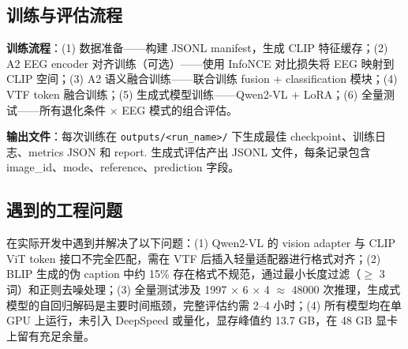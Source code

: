 \subsection{训练与评估流程}

\textbf{训练流程}：(1) 数据准备——构建 JSONL manifest，生成 CLIP 特征缓存；(2) A2 EEG encoder 对齐训练（可选）——使用 InfoNCE 对比损失将 EEG 映射到 CLIP 空间；(3) A2 语义融合训练——联合训练 fusion + classification 模块；(4) VTF token 融合训练；(5) 生成式模型训练——Qwen2-VL + LoRA；(6) 全量测试——所有退化条件 $\times$ EEG 模式的组合评估。

\textbf{输出文件}：每次训练在 \texttt{outputs/<run\_name>/} 下生成最佳 checkpoint、训练日志、metrics JSON 和 report. 生成式评估产出 JSONL 文件，每条记录包含 image\_id、mode、reference、prediction 字段。

\subsection{遇到的工程问题}

在实际开发中遇到并解决了以下问题：(1) Qwen2-VL 的 vision adapter 与 CLIP ViT token 接口不完全匹配，需在 VTF 后插入轻量适配器进行格式对齐；(2) BLIP 生成的伪 caption 中约 15\% 存在格式不规范，通过最小长度过滤（$\geq$ 3 词）和正则去噪处理；(3) 全量测试涉及 1997 $\times$ 6 $\times$ 4 $\approx$ 48000 次推理，生成式模型的自回归解码是主要时间瓶颈，完整评估约需 2--4 小时；(4) 所有模型均在单 GPU 上运行，未引入 DeepSpeed 或量化，显存峰值约 13.7 GB，在 48 GB 显卡上留有充足余量。
